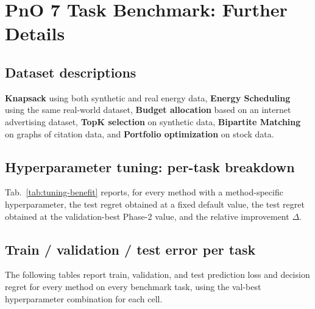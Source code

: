 \section{PnO 7 Task Benchmark: Further Details}
\label{app:bench}
\subsection{Dataset descriptions}
\textbf{Knapsack} using both synthetic and real energy data, \textbf{Energy Scheduling} using the same real-world dataset, \textbf{Budget allocation} based on an internet advertising dataset, \textbf{TopK selection} on synthetic data,  \textbf{Bipartite Matching} on graphs of citation data, and \textbf{Portfolio optimization} on stock data.

\subsection{Hyperparameter tuning: per-task breakdown}
Tab.~\ref{tab:tuning-benefit} reports, for every method with a method-specific hyperparameter, the test regret obtained at a fixed default value, the test regret obtained at the validation-best Phase-2 value, and the relative improvement $\Delta$.


\subsection{Train / validation / test error per task}
The following tables report train, validation, and test prediction loss and decision regret for every method on every benchmark task, using the val-best hyperparameter combination for each cell.

